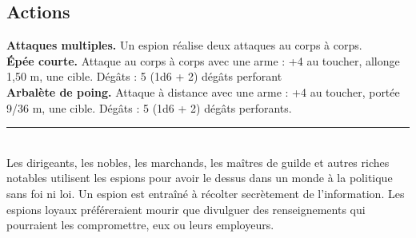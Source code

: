 \begin{figure*}[hb!]
{\begin{minipage}[c]{.45\linewidth}
    \subsection*{Actions}
    {\bfseries Attaques multiples.} Un espion réalise deux attaques au corps à corps. \\
    {\bfseries Épée courte.} Attaque au corps à corps avec une arme : +4 au toucher, allonge 1,50 m, une cible. Dégâts : 5 (1d6 + 2) dégâts perforant \\
    {\bfseries Arbalète de poing.} Attaque à distance avec une arme : +4 au toucher, portée 9/36 m, une cible. Dégâts : 5 (1d6 + 2) dégâts perforants. \\
    \noindent\rule{\textwidth}{1pt} \\
Les dirigeants, les nobles, les marchands, les maîtres de guilde et autres riches notables utilisent les espions pour avoir le dessus dans un monde à la politique sans foi ni loi. Un espion est entraîné à récolter secrètement de l'information. Les espions loyaux préféreraient mourir que divulguer des renseignements qui pourraient les compromettre, eux ou leurs employeurs.
  \end{minipage}
}%
\end{figure*}

